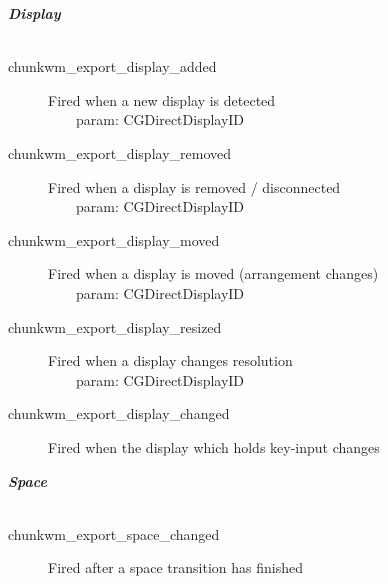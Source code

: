 \documentclass[14pt,a4paper]{article}
\begin{document}
\textbf{\textit{Display}}
\\\
\begin{description}
\item[chunkwm\_export\_display\_added]
Fired when a new display is detected
\\\ \ \ \ param: CGDirectDisplayID
\item[chunkwm\_export\_display\_removed]
Fired when a display is removed / disconnected
\\\ \ \ \ param: CGDirectDisplayID
\item[chunkwm\_export\_display\_moved]
Fired when a display is moved (arrangement changes)
\\\ \ \ \ param: CGDirectDisplayID
\item[chunkwm\_export\_display\_resized]
Fired when a display changes resolution
\\\ \ \ \ param: CGDirectDisplayID
\item[chunkwm\_export\_display\_changed]
Fired when the display which holds key-input changes
\medskip
\end{description}
\textbf{\textit{Space}}
\\\
\begin{description}
\item[chunkwm\_export\_space\_changed]
Fired after a space transition has finished
\medskip
\end{description}
\end{document}
